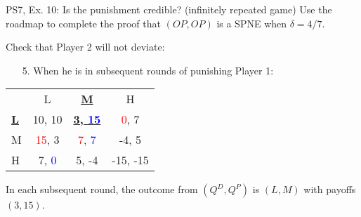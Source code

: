 \begin{frame}{PS7, Ex. 10: Is the punishment credible? (infinitely repeated game)}
  Use the roadmap to complete the proof that $(OP,OP)$ is a SPNE when $\delta=4/7$.\vspace{-4pt}
  \begin{multicols}{2}
    Check that Player 2 will not deviate:
    \begin{itemize}
      \item[5.] When he is in subsequent rounds of punishing Player 1:
    \end{itemize}
    \vfill\null\columnbreak
    \vspace{-6pt}
    \begin{table}
      \begin{tabular}{l|c|c|c|}
        \multicolumn{1}{c}{} & \multicolumn{1}{c}{L} & \multicolumn{1}{c}{\textbf{\underline{M}}} & \multicolumn{1}{c}{H} \\\cline{2-4}
        \textbf{\underline{L}} & 10, 10 & \textbf{\underline{3, \textcolor{blue}{15}}} & \textcolor{red}{0}, 7 \\\cline{2-4}
        M & \textcolor{red}{15}, 3 & \textcolor{red}{7}, \textcolor{blue}{7} & -4, 5 \\\cline{2-4}
        H & 7, \textcolor{blue}{0} & 5, -4 & -15, -15 \\\cline{2-4}
      \end{tabular}
    \end{table}
    \vspace{-8pt}
  \end{multicols}
    In each subsequent round, the outcome from $(Q^D,Q^P)$ is $(L,M)$ with payoffs $(3,15)$.
    \vfill\null
\end{frame}
